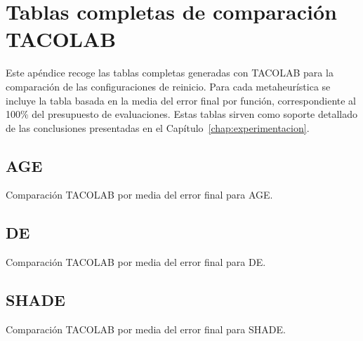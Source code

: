 \chapter{Tablas completas de comparación TACOLAB}
\label{ap:tablas_tacolab_reinicio}

Este apéndice recoge las tablas completas generadas con TACOLAB para la comparación de las configuraciones de reinicio. Para cada metaheurística se incluye la tabla basada en la media del error final por función, correspondiente al 100\% del presupuesto de evaluaciones. Estas tablas sirven como soporte detallado de las conclusiones presentadas en el Capítulo~\ref{chap:experimentacion}.

\section{AGE}

\begin{table}[H]
    \centering
    \scriptsize
    \caption{Comparación TACOLAB por media del error final para AGE.}
    \label{tab:tacolab_age_media}
    \begin{adjustbox}{max width=\textwidth}
        
    \end{adjustbox}
\end{table}

\section{DE}

\begin{table}[H]
    \centering
    \scriptsize
    \caption{Comparación TACOLAB por media del error final para DE.}
    \label{tab:tacolab_de_media}
    \begin{adjustbox}{max width=\textwidth}
        
    \end{adjustbox}
\end{table}

\section{SHADE}

\begin{table}[H]
    \centering
    \scriptsize
    \caption{Comparación TACOLAB por media del error final para SHADE.}
    \label{tab:tacolab_shade_media}
    \begin{adjustbox}{max width=\textwidth}
        
    \end{adjustbox}
\end{table}

